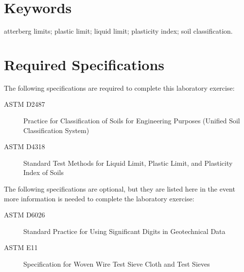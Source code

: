 \documentclass[12pt]{article}
\begin{document}
\vfill
\section*{Keywords}
\normalsize atterberg limits; plastic limit; liquid limit; plasticity index; soil classification.\\
\pagebreak
\begin{center}
\tableofcontents
\pagebreak
\listoftables
\listoffigures
\end{center}
\pagebreak
\section*{Required Specifications}
The following specifications are required to complete this laboratory exercise:
\begin{description}
\item[ASTM D2487] Practice for Classification of Soils for Engineering Purposes (Unified Soil Classification System)
\item[ASTM D4318] Standard Test Methods for Liquid Limit, Plastic Limit, and Plasticity Index of Soils
\end{description}

The following specifications are optional, but they are listed here in the event more information is needed to complete the laboratory exercise:
\begin{description}
\item[ASTM D6026] Standard Practice for Using Significant Digits in Geotechnical Data
\item[ASTM E11] Specification for Woven Wire Test Sieve Cloth and Test Sieves
\end{description}
\pagebreak
\end{document}
